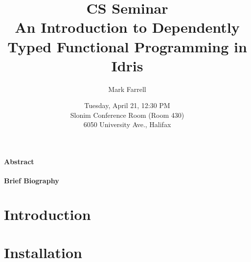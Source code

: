 \documentclass[10pt, english]{article}
\title{
  \large CS Seminar \\
  \normalsize An Introduction to Dependently Typed Functional Programming in Idris
}
\date{
  \normalsize
  Tuesday, April 21, 12:30 PM \\
  Slonim Conference Room (Room 430) \\
  6050 University Ave., Halifax
}
\author{\normalsize Mark Farrell}
\begin{document}
\maketitle
\thispagestyle{empty}

\paragraph{Abstract}











\paragraph{Brief Biography}



\newpage

\section{Introduction}



\section{Installation}


\newpage



\end{document}
